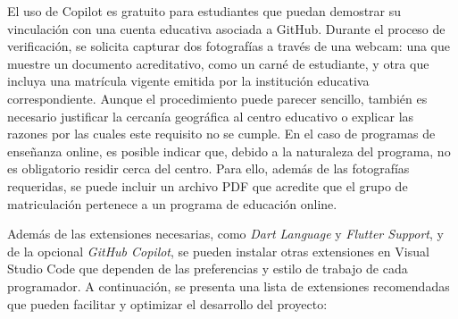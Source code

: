El uso de Copilot es gratuito para estudiantes que puedan demostrar su vinculación con una cuenta educativa asociada a GitHub. Durante el proceso de verificación, se solicita capturar dos fotografías a través de una webcam: una que muestre un documento acreditativo, como un carné de estudiante, y otra que incluya una matrícula vigente emitida por la institución educativa correspondiente. Aunque el procedimiento puede parecer sencillo, también es necesario justificar la cercanía geográfica al centro educativo o explicar las razones por las cuales este requisito no se cumple. En el caso de programas de enseñanza online, es posible indicar que, debido a la naturaleza del programa, no es obligatorio residir cerca del centro. Para ello, además de las fotografías requeridas, se puede incluir un archivo PDF que acredite que el grupo de matriculación pertenece a un programa de educación online.

Además de las extensiones necesarias, como \textit{Dart Language} y \textit{Flutter Support}, y de la opcional \textit{GitHub Copilot}, se pueden instalar otras extensiones en Visual Studio Code que dependen de las preferencias y estilo de trabajo de cada programador. A continuación, se presenta una lista de extensiones recomendadas que pueden facilitar y optimizar el desarrollo del proyecto:

